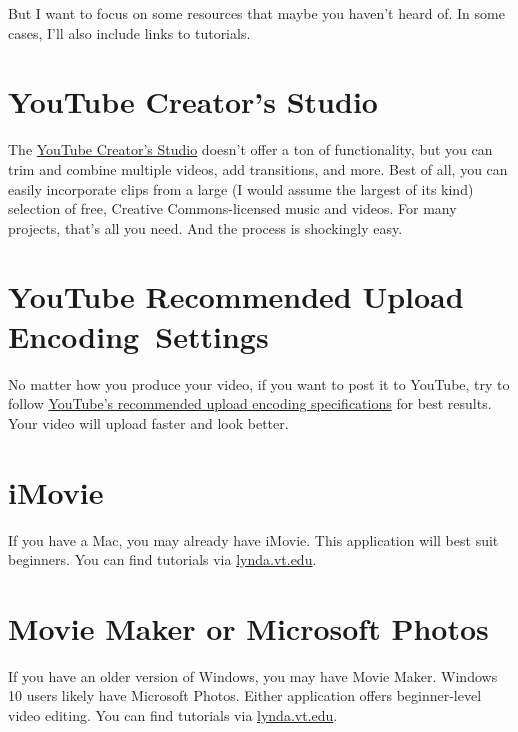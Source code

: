 \documentclass[]{book}
\theoremstyle{definition}
\theoremstyle{definition}
\theoremstyle{definition}
\theoremstyle{remark}
\begin{document}
But I want to focus on some resources that maybe you haven't heard of.
In some cases, I'll also include links to tutorials.

\hypertarget{youtube-creators-studio}{%
\section{YouTube Creator's Studio}\label{youtube-creators-studio}}

The \href{https://www.youtube.com/dashboard?o=U}{YouTube Creator's
Studio} doesn't offer a ton of functionality, but you can trim and
combine multiple videos, add transitions, and more. Best of all, you can
easily incorporate clips from a large (I would assume the largest of its
kind) selection of free, Creative Commons-licensed music and videos. For
many projects, that's all you need. And the process is shockingly easy.

\hypertarget{youtube-recommended-upload-encodingsettings}{%
\section{YouTube Recommended Upload
Encoding~Settings}\label{youtube-recommended-upload-encodingsettings}}

No matter how you produce your video, if you want to post it to YouTube,
try to follow
\href{https://support.google.com/youtube/answer/1722171?hl=en}{YouTube's
recommended upload encoding specifications} for best results. Your video
will upload faster and look better.

\hypertarget{imovie}{%
\section{iMovie}\label{imovie}}

If you have a Mac, you may already have iMovie. This application will
best suit beginners. You can find tutorials via
\href{http://lynda.vt.edu/}{lynda.vt.edu}.

\hypertarget{movie-maker-or-microsoft-photos}{%
\section{Movie Maker or Microsoft
Photos}\label{movie-maker-or-microsoft-photos}}

If you have an older version of Windows, you may have Movie Maker.
Windows 10 users likely have Microsoft Photos. Either application offers
beginner-level video editing. You can find tutorials via
\href{http://lynda.vt.edu/}{lynda.vt.edu}.
\end{document}
